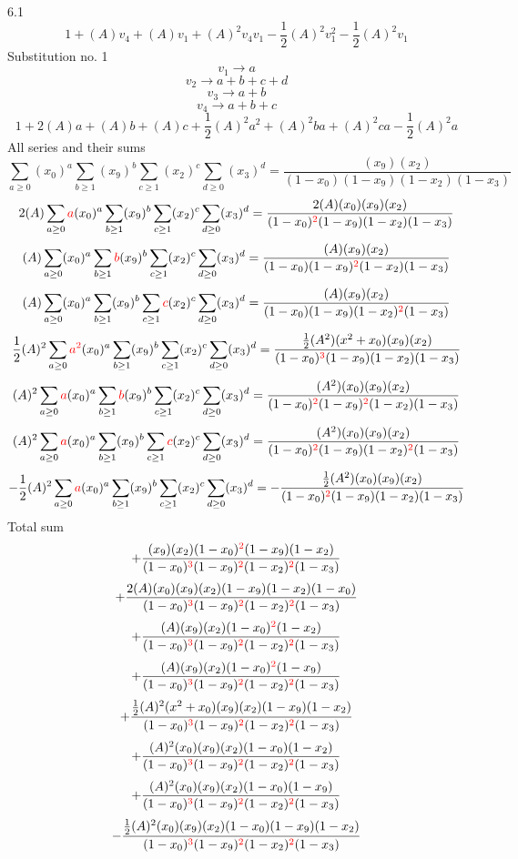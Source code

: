 \documentclass{article}
\begin{document}
                
6.1
\[1+(A)v_4+(A)v_1+(A)^2v_4v_1-\frac{1}{2}(A)^2v_1^{2}-\frac{1}{2}(A)^2v_1\]Substitution no. 1\[v_1\rightarrow{a}\]\[v_2\rightarrow{a+b+c+d}\]\[v_3\rightarrow{a+b}\]\[v_4\rightarrow{a+b+c}\]\[1+2(A)a+(A)b+(A)c+\frac{1}{2}(A)^2a^{2}+(A)^2ba+(A)^2ca-\frac{1}{2}(A)^2a\]All series and their sums\[\sum_{a\geq{0}}(x_0)^{a}\sum_{b\geq{1}}(x_9)^{b}\sum_{c\geq{1}}(x_2)^{c}\sum_{d\geq{0}}(x_3)^{d}=\frac{(x_9)(x_2)}{(1-x_0)(1-x_9)(1-x_2)(1-x_3)}\]\[2(A)\sum_{a\geq{0}}\textcolor{red}{a}(x_0)^{a}\sum_{b\geq{1}}(x_9)^{b}\sum_{c\geq{1}}(x_2)^{c}\sum_{d\geq{0}}(x_3)^{d}=\frac{2(A)(x_0)(x_9)(x_2)}{(1-x_0)^{\textcolor{red}{2}}(1-x_9)(1-x_2)(1-x_3)}\]\[(A)\sum_{a\geq{0}}(x_0)^{a}\sum_{b\geq{1}}\textcolor{red}{b}(x_9)^{b}\sum_{c\geq{1}}(x_2)^{c}\sum_{d\geq{0}}(x_3)^{d}=\frac{(A)(x_9)(x_2)}{(1-x_0)(1-x_9)^{\textcolor{red}{2}}(1-x_2)(1-x_3)}\]\[(A)\sum_{a\geq{0}}(x_0)^{a}\sum_{b\geq{1}}(x_9)^{b}\sum_{c\geq{1}}\textcolor{red}{c}(x_2)^{c}\sum_{d\geq{0}}(x_3)^{d}=\frac{(A)(x_9)(x_2)}{(1-x_0)(1-x_9)(1-x_2)^{\textcolor{red}{2}}(1-x_3)}\]\[\frac{1}{2}(A)^{2}\sum_{a\geq{0}}\textcolor{red}{a^{2}}(x_0)^{a}\sum_{b\geq{1}}(x_9)^{b}\sum_{c\geq{1}}(x_2)^{c}\sum_{d\geq{0}}(x_3)^{d}=\frac{\frac{1}{2}(A^{2})(x^{2}+x_0)(x_9)(x_2)}{(1-x_0)^{\textcolor{red}{3}}(1-x_9)(1-x_2)(1-x_3)}\]\[(A)^{2}\sum_{a\geq{0}}\textcolor{red}{a}(x_0)^{a}\sum_{b\geq{1}}\textcolor{red}{b}(x_9)^{b}\sum_{c\geq{1}}(x_2)^{c}\sum_{d\geq{0}}(x_3)^{d}=\frac{(A^{2})(x_0)(x_9)(x_2)}{(1-x_0)^{\textcolor{red}{2}}(1-x_9)^{\textcolor{red}{2}}(1-x_2)(1-x_3)}\]\[(A)^{2}\sum_{a\geq{0}}\textcolor{red}{a}(x_0)^{a}\sum_{b\geq{1}}(x_9)^{b}\sum_{c\geq{1}}\textcolor{red}{c}(x_2)^{c}\sum_{d\geq{0}}(x_3)^{d}=\frac{(A^{2})(x_0)(x_9)(x_2)}{(1-x_0)^{\textcolor{red}{2}}(1-x_9)(1-x_2)^{\textcolor{red}{2}}(1-x_3)}\]\[-\frac{1}{2}(A)^{2}\sum_{a\geq{0}}\textcolor{red}{a}(x_0)^{a}\sum_{b\geq{1}}(x_9)^{b}\sum_{c\geq{1}}(x_2)^{c}\sum_{d\geq{0}}(x_3)^{d}=-\frac{\frac{1}{2}(A^{2})(x_0)(x_9)(x_2)}{(1-x_0)^{\textcolor{red}{2}}(1-x_9)(1-x_2)(1-x_3)}\]
Total sum
\[+\frac{(x_9)(x_2)(1-x_0)^{\textcolor{red}{2}}(1-x_9)(1-x_2)}{(1-x_0)^{\textcolor{red}{3}}(1-x_9)^{\textcolor{red}{2}}(1-x_2)^{\textcolor{red}{2}}(1-x_3)}\]\[+\frac{2(A)(x_0)(x_9)(x_2)(1-x_9)(1-x_2)(1-x_0)}{(1-x_0)^{\textcolor{red}{3}}(1-x_9)^{\textcolor{red}{2}}(1-x_2)^{\textcolor{red}{2}}(1-x_3)}\]\[+\frac{(A)(x_9)(x_2)(1-x_0)^{\textcolor{red}{2}}(1-x_2)}{(1-x_0)^{\textcolor{red}{3}}(1-x_9)^{\textcolor{red}{2}}(1-x_2)^{\textcolor{red}{2}}(1-x_3)}\]\[+\frac{(A)(x_9)(x_2)(1-x_0)^{\textcolor{red}{2}}(1-x_9)}{(1-x_0)^{\textcolor{red}{3}}(1-x_9)^{\textcolor{red}{2}}(1-x_2)^{\textcolor{red}{2}}(1-x_3)}\]\[+\frac{\frac{1}{2}(A)^{2}(x^{2}+x_0)(x_9)(x_2)(1-x_9)(1-x_2)}{(1-x_0)^{\textcolor{red}{3}}(1-x_9)^{\textcolor{red}{2}}(1-x_2)^{\textcolor{red}{2}}(1-x_3)}\]\[+\frac{(A)^{2}(x_0)(x_9)(x_2)(1-x_0)(1-x_2)}{(1-x_0)^{\textcolor{red}{3}}(1-x_9)^{\textcolor{red}{2}}(1-x_2)^{\textcolor{red}{2}}(1-x_3)}\]\[+\frac{(A)^{2}(x_0)(x_9)(x_2)(1-x_0)(1-x_9)}{(1-x_0)^{\textcolor{red}{3}}(1-x_9)^{\textcolor{red}{2}}(1-x_2)^{\textcolor{red}{2}}(1-x_3)}\]\[-\frac{\frac{1}{2}(A)^{2}(x_0)(x_9)(x_2)(1-x_0)(1-x_9)(1-x_2)}{(1-x_0)^{\textcolor{red}{3}}(1-x_9)^{\textcolor{red}{2}}(1-x_2)^{\textcolor{red}{2}}(1-x_3)}\]
\end{document}
